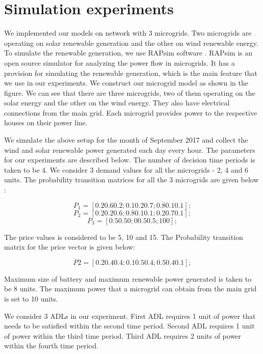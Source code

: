 \section{Simulation experiments}
We implemented our models on network with 3 microgrids. Two microgrids are operating on solar renewable generation and the other on wind renewable energy. To simulate the renewable generation, we use RAPsim software \cite{rapsim}. RAPsim is an open source simulator for analyzing the power flow in microgrids. It has a provision for simulating the renewable generation, which is the main feature that we use in our experiments. We construct our microgrid model as shown in the figure. We can see that there are three microgrids, two of them operating on the solar energy and the other on the wind energy. They also have electrical connections from the main grid. Each microgrid provides power to the respective houses on their power line. 


We simulate the above setup for the month of September 2017 and collect the wind and solar renewable power generated each day every hour. The parameters for our experiments are described below. The number of decision time periods is taken to be 4. We consider 3 demand values for all the microgrids - 2, 4 and 6 units. The probability transition matrices for all the 3 microgrids are given below :

$$
P_{1} = [0.2 0.6 0.2;0.1 0.2 0.7;0.8 0.1 0.1]; $$
$$
P_{2} = [0.2 0.2 0.6;0.8 0.1 0.1;0.2 0.7 0.1]; $$
$$P_{3} = [0.5 0.5 0;0 0.5 0.5;1 0 0];$$

The price values is considered to be 5, 10 and 15. The Probability transition matrix for the price vector is given below:

$$ P2 = [0.2 0.4 0.4;0.1 0.5 0.4;0.5 0.4 0.1];$$

Maximum size of battery and maximum renewable power generated is taken to be 8 units. The maximum power that a microgrid can obtain from the main grid is set to 10 units.

We consider 3 ADLs in our experiment. First ADL requires 1 unit of power that needs to be satisfied within the second time period. Second ADL requires 1 unit of power within the third time period. Third ADL requires 2 units of power within the fourth time period.

